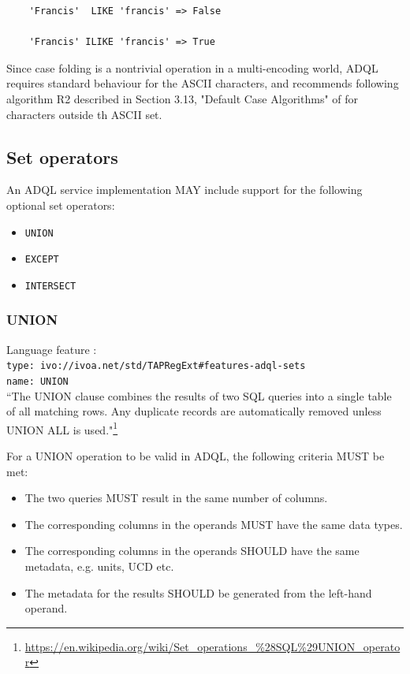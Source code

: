 \documentclass[11pt,a4paper]{ivoa}
\begin{document}
\begin{verbatim}
    'Francis'  LIKE 'francis' => False

    'Francis' ILIKE 'francis' => True
\end{verbatim}

Since case folding is a nontrivial operation in a multi-encoding world,
ADQL requires standard behaviour for the ASCII characters, and recommends
following algorithm R2 described in Section 3.13, "Default Case Algorithms"
of \citet{std:UNICODE} for characters outside th ASCII set.

\subsection{Set operators}
\label{sec:set.operators}

An ADQL service implementation MAY include support for the following optional
set operators:

\begin{itemize}
    \item \verb:UNION:
    \item \verb:EXCEPT:
    \item \verb:INTERSECT:
\end{itemize}

\subsubsection{UNION}
{\footnotesize Language feature :}\\
{\footnotesize \verb|type: ivo://ivoa.net/std/TAPRegExt#features-adql-sets|}\\
{\footnotesize \verb|name: UNION|}\\

``The UNION clause combines the results of two SQL queries into a single
table of all matching rows. Any duplicate records are automatically removed
unless UNION ALL is used."\footnote{\url{https://en.wikipedia.org/wiki/Set\_operations\_\%28SQL\%29UNION\_operator}}

For a UNION operation to be valid in ADQL, the following criteria MUST be met:

\begin{itemize}
    \item The two queries MUST result in the same number of columns.
    \item The corresponding columns in the operands MUST have the same data types.
    \item The corresponding columns in the operands SHOULD have the same metadata, e.g. units, UCD etc.
    \item The metadata for the results SHOULD be generated from the left-hand operand.
\end{itemize}
\end{document}
